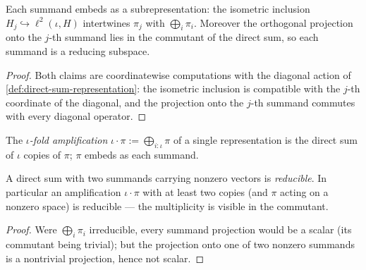 \begin{theorem}
    \label{thrm:direct-sum-subrepresentation}
    \leanok
    Each summand embeds as a subrepresentation: the isometric inclusion $H_j \hookrightarrow \ell^2(\iota, H)$ intertwines $\pi_j$ with $\bigoplus_i \pi_i$. Moreover the orthogonal projection onto the $j$-th summand lies in the commutant of the direct sum, so each summand is a reducing subspace.
\end{theorem}
\begin{proof}
    \leanok
    Both claims are coordinatewise computations with the diagonal action of \ref{def:direct-sum-representation}: the isometric inclusion is compatible with the $j$-th coordinate of the diagonal, and the projection onto the $j$-th summand commutes with every diagonal operator.
\end{proof}

\begin{definition}[Amplification]
    \label{def:amplification}
    \leanok
    The \emph{$\iota$-fold amplification} $\iota \cdot \pi := \bigoplus_{i : \iota} \pi$ of a single representation is the direct sum of $\iota$ copies of $\pi$; $\pi$ embeds as each summand.
\end{definition}

\begin{theorem}
    \label{thrm:direct-sum-reducible}
    \leanok
    A direct sum with two summands carrying nonzero vectors is \emph{reducible}. In particular an amplification $\iota \cdot \pi$ with at least two copies (and $\pi$ acting on a nonzero space) is reducible --- the multiplicity is visible in the commutant.
\end{theorem}
\begin{proof}
    \leanok
    Were $\bigoplus_i \pi_i$ irreducible, every summand projection would be a scalar (its commutant being trivial); but the projection onto one of two nonzero summands is a nontrivial projection, hence not scalar.
\end{proof}

